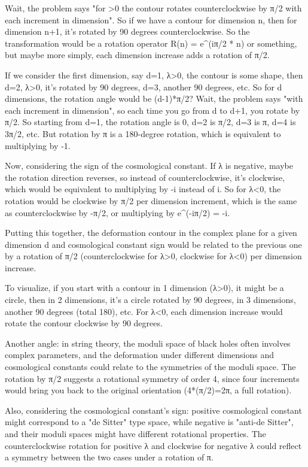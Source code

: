 Wait, the problem says "for >0 the contour rotates counterclockwise by π/2 with each increment in dimension". So if we have a contour for dimension n, then for dimension n+1, it's rotated by 90 degrees counterclockwise. So the transformation would be a rotation operator R(n) = e^(iπ/2 * n) or something, but maybe more simply, each dimension increase adds a rotation of π/2. 

If we consider the first dimension, say d=1, λ>0, the contour is some shape, then d=2, λ>0, it's rotated by 90 degrees, d=3, another 90 degrees, etc. So for d dimensions, the rotation angle would be (d-1)*π/2? Wait, the problem says "with each increment in dimension", so each time you go from d to d+1, you rotate by π/2. So starting from d=1, the rotation angle is 0, d=2 is π/2, d=3 is π, d=4 is 3π/2, etc. But rotation by π is a 180-degree rotation, which is equivalent to multiplying by -1. 

Now, considering the sign of the cosmological constant. If λ is negative, maybe the rotation direction reverses, so instead of counterclockwise, it's clockwise, which would be equivalent to multiplying by -i instead of i. So for λ<0, the rotation would be clockwise by π/2 per dimension increment, which is the same as counterclockwise by -π/2, or multiplying by e^(-iπ/2) = -i. 

Putting this together, the deformation contour in the complex plane for a given dimension d and cosmological constant sign would be related to the previous one by a rotation of π/2 (counterclockwise for λ>0, clockwise for λ<0) per dimension increase. 

To visualize, if you start with a contour in 1 dimension (λ>0), it might be a circle, then in 2 dimensions, it's a circle rotated by 90 degrees, in 3 dimensions, another 90 degrees (total 180), etc. For λ<0, each dimension increase would rotate the contour clockwise by 90 degrees. 

Another angle: in string theory, the moduli space of black holes often involves complex parameters, and the deformation under different dimensions and cosmological constants could relate to the symmetries of the moduli space. The rotation by π/2 suggests a rotational symmetry of order 4, since four increments would bring you back to the original orientation (4*(π/2)=2π, a full rotation). 

Also, considering the cosmological constant's sign: positive cosmological constant might correspond to a "de Sitter" type space, while negative is "anti-de Sitter", and their moduli spaces might have different rotational properties. The counterclockwise rotation for positive λ and clockwise for negative λ could reflect a symmetry between the two cases under a rotation of π. 

